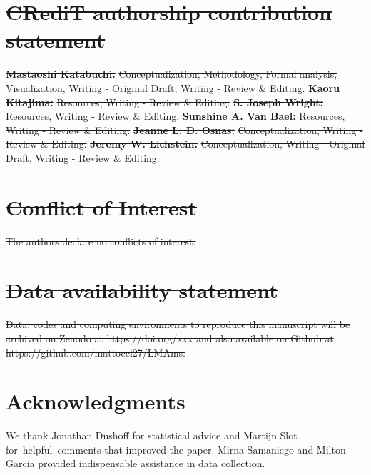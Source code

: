 \documentclass[
  12pt,
  letterpaper,
  DIV=11,
  numbers=noendperiod]{scrartcl}
\providecommand{\DIFdel}[1]{{\protect\color{red}\sout{#1}}}                      %
\providecommand{\DIFaddbegin}{} %
\providecommand{\DIFdelbegin}{} %
\providecommand{\DIFdelend}{} %
\newcommand{\DIFscaledelfig}{0.5}
\newlength{\DIFdelgraphicswidth} %
\newlength{\DIFdelgraphicsheight} %
\newcommand{\DIFaddincludegraphics}[2][]{{\color{blue}\fbox{\DIFOincludegraphics[#1]{#2}}}} %
\newcommand{\DIFdelincludegraphics}[2][]{%
\sbox{\DIFdelgraphicsbox}{\DIFOincludegraphics[#1]{#2}}%
\settoboxwidth{\DIFdelgraphicswidth}{\DIFdelgraphicsbox} %
\settoboxtotalheight{\DIFdelgraphicsheight}{\DIFdelgraphicsbox} %
\scalebox{\DIFscaledelfig}{%
\parbox[b]{\DIFdelgraphicswidth}{\usebox{\DIFdelgraphicsbox}\\[-\baselineskip] \rule{\DIFdelgraphicswidth}{0em}}\llap{\resizebox{\DIFdelgraphicswidth}{\DIFdelgraphicsheight}{%
\setlength{\unitlength}{\DIFdelgraphicswidth}%
\begin{picture}(1,1)%
\thicklines\linethickness{2pt} %
{\color[rgb]{1,0,0}\put(0,0){\framebox(1,1){}}}%
{\color[rgb]{1,0,0}\put(0,0){\line( 1,1){1}}}%
{\color[rgb]{1,0,0}\put(0,1){\line(1,-1){1}}}%
\end{picture}%
}\hspace*{3pt}}} %
} %
\DeclareRobustCommand{\DIFaddbegin}{\DIFOaddbegin \let\includegraphics\DIFaddincludegraphics} %
\DeclareRobustCommand{\DIFdelbegin}{\DIFOdelbegin \let\includegraphics\DIFdelincludegraphics} %
\DeclareRobustCommand{\DIFdelend}{\DIFOaddend \let\includegraphics\DIFOincludegraphics} %
\begin{document}
\DIFdelbegin \section{\DIFdel{CRediT authorship contribution
statement}}%
\addtocounter{section}{-1}%

\textbf{\DIFdel{Mastaoshi Katabuchi:}} %
\DIFdel{Conceptualization, Methodology, Formal
analysis, Visualization, Writing - Original Draft, Writing - Review \&
Editing. }\textbf{\DIFdel{Kaoru Kitajima:}} %
\DIFdel{Resources, Writing - Review \&
Editing. }\textbf{\DIFdel{S. Joseph Wright:}} %
\DIFdel{Resources, Writing - Review \&
Editing. }\textbf{\DIFdel{Sunshine A. Van Bael:}} %
\DIFdel{Resources, Writing - Review \&
Editing. }\textbf{\DIFdel{Jeanne L. D. Osnas:}} %
\DIFdel{Conceptualization, Writing -
Review \& Editing. }\textbf{\DIFdel{Jeremy W. Lichstein:}} %
\DIFdel{Conceptualization,
Writing - Original Draft, Writing - Review \& Editing.
}%

\section{\DIFdel{Conflict of Interest}}%
\addtocounter{section}{-1}%

\DIFdel{The authors declare no conflicts of interest.
}%

\section{\DIFdel{Data availability statement}}%
\addtocounter{section}{-1}%

\DIFdel{Data, codes and computing environments to reproduce this manuscript will
be archived on Zenodo at https://doi.org/xxx and also available on
Github at https://github.com/mattocci27/LMAms.
}%

\DIFdelend \section{Acknowledgments}\label{acknowledgments}

We thank Jonathan Dushoff for statistical advice and Martijn Slot
for~helpful~comments that improved the paper. Mirna Samaniego and Milton
Garcia provided indispensable assistance in data collection.
\DIFaddbegin 
\end{document}
